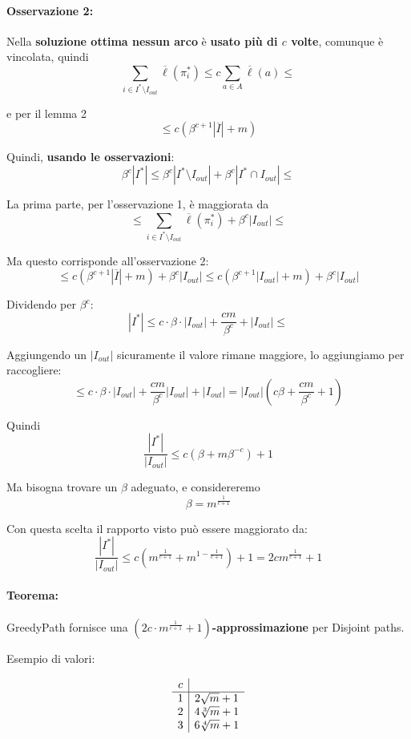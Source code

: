 \documentclass[11pt]{article}
\begin{document}
	\paragraph{Osservazione 2:} Nella \textbf{soluzione ottima nessun arco} è \textbf{usato più di $c$ volte}, comunque è vincolata, quindi
	$$ \sum_{i \in I^\ast \setminus I_{out}} \overline{\ell}(\pi_i^\ast) \leq c \sum_{a \in A} \overline{\ell} (a) \leq $$

	e per il lemma 2 
	$$ \leq c \left( \beta^{c+1}|\overline{I}| + m \right) $$
	
	\nn 
	Quindi, \textbf{usando le osservazioni}: 
	$$ \beta^c |I^\ast| \leq \beta^c |I^\ast \setminus I_{out}| + \beta^c |I^\ast \cap I_{out}| \leq $$
	
	La prima parte, per l'osservazione 1, è maggiorata da
	$$ \leq \sum_{i \in I^\ast \setminus I_{out}} \overline{\ell} (\pi_i^\ast) + \beta^c |I_{out}| \leq $$
	
	Ma questo corrisponde all'osservazione 2:
	$$ \leq c \left( \beta^{c+1}|\overline{I}| + m \right) + \beta^c |I_{out}| \leq  c \left( \beta^{c+1}|I_{out}| + m \right) + \beta^c |I_{out}| $$
	
	Dividendo per $\beta^c$:
	$$ |I^\ast| \leq c \cdot \beta \cdot |I_{out}| + \frac{cm}{\beta^c} + |I_{out}| \leq $$
	
	Aggiungendo un $|I_{out}|$ sicuramente il valore rimane maggiore, lo aggiungiamo per raccogliere:
	$$ \leq c \cdot \beta \cdot |I_{out}| + \frac{cm}{\beta^c} |I_{out}| + |I_{out}| = |I_{out}| \left(c \beta + \frac{cm}{\beta^c} + 1\right) $$
	
	Quindi
	$$ \frac{|I^\ast|}{|I_{out}|} \leq c \left(\beta + m \beta^{-c}\right) + 1$$
	
	Ma bisogna trovare un $\beta$ adeguato, e considereremo
	$$ \beta = m^{\frac{1}{c+1}}$$
	
	Con questa scelta il rapporto visto può essere maggiorato da:  
	$$ \frac{|I^\ast|}{|I_{out}|} \leq c \left(m^{\frac{1}{c+1}} + m^{1-\frac{1}{c+1}}\right) + 1 = 2c m^{\frac{1}{c+1}} + 1 $$
	
	\paragraph{Teorema:} GreedyPath fornisce una \textbf{$\left(2c \cdot m^{\frac{1}{c+1}} + 1\right)$-approssimazione} per Disjoint paths.
	
	\vfill
	
	Esempio di valori:
	\begin{center}
		$$
		\begin{array}{c | c}
			c & \\
			\hline
			1 & 2 \sqrt{m} + 1 \\
			2 & 4 \sqrt[3]{m} + 1 \\
			3 & 6 \sqrt[4]{m} + 1 \\
		\end{array}
		$$
	\end{center}
	
\end{document}
